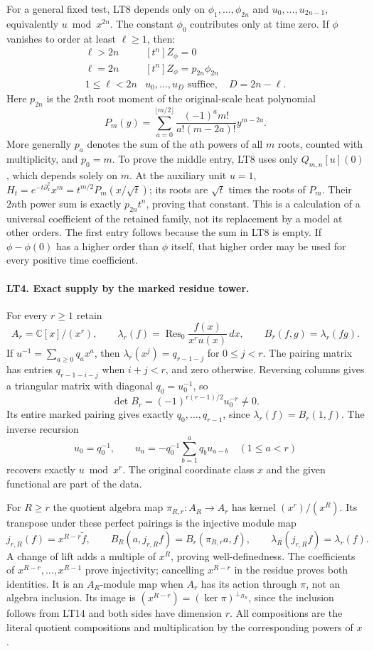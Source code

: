 For a general fixed test, LT8 depends only on $\phi_1,\ldots,\phi_{2n}$
and $u_0,\ldots,u_{2n-1}$, equivalently $u\bmod x^{2n}$.
The constant $\phi_0$ contributes only at time zero.
If $\phi$ vanishes to order at least $\ell\ge1$, then:
\[
 \begin{array}{c|c}
  \ell>2n &[t^n]Z_\phi=0\\
  \ell=2n &[t^n]Z_\phi=p_{2n}\phi_{2n}\\
  1\le\ell<2n &u_0,\ldots,u_D\text{ suffice},\quad D=2n-\ell.
 \end{array}
 \tag{LT9}
\]
Here $p_{2n}$ is the $2n$th root moment of the original-scale
heat polynomial
\[
 P_m(y)=\sum_{a=0}^{\lfloor m/2\rfloor}
       \frac{(-1)^am!}{a!(m-2a)!}y^{m-2a}.
 \tag{LT10}
\]
More generally $p_a$ denotes the sum of the $a$th powers of
all $m$ roots, counted with multiplicity, and $p_0=m$.
To prove the middle entry, LT8 uses only $Q_{m,n}[u](0)$,
which depends solely on $m$. At the auxiliary unit $u=1$,
$H_t=e^{-t\partial_x^2}x^m=t^{m/2}P_m(x/\sqrt t)$;
its roots are $\sqrt t$ times the roots of $P_m$.
Their $2n$th power sum is exactly $p_{2n}t^n$, proving that
constant. This is a calculation of a universal coefficient of the
retained family, not its replacement by a model at other orders.
The first entry follows because the sum in LT8 is empty.
If $\phi-\phi(0)$ has a higher order than $\phi$ itself, that
higher order may be used for every positive time coefficient.

\paragraph{LT4. Exact supply by the marked residue tower.}
For every $r\ge1$ retain
\[
 A_r=\mathbb C[x]/(x^r),\qquad
 \lambda_r(f)=\operatorname{Res}_0\frac{f(x)}{x^ru(x)}\,dx,
 \qquad B_r(f,g)=\lambda_r(fg).
 \tag{LT11}
\]
If $u^{-1}=\sum_{a\ge0}q_ax^a$, then
$\lambda_r(x^j)=q_{r-1-j}$ for $0\le j<r$.
The pairing matrix has entries $q_{r-1-i-j}$ when $i+j<r$,
and zero otherwise. Reversing columns gives a triangular matrix
with diagonal $q_0=u_0^{-1}$, so
\[
 \det B_r=(-1)^{r(r-1)/2}u_0^{-r}\ne0.
 \tag{LT12}
\]
Its entire marked pairing gives exactly $q_0,\ldots,q_{r-1}$,
since $\lambda_r(f)=B_r(1,f)$. The inverse recursion
\[
 u_0=q_0^{-1},\qquad
 u_a=-q_0^{-1}\sum_{b=1}^a q_bu_{a-b}\quad(1\le a<r)
 \tag{LT13}
\]
recovers exactly $u\bmod x^r$.
The original coordinate class $x$ and the given functional are
part of the data.

For $R\ge r$ the quotient algebra map $\pi_{R,r}:A_R\to A_r$
has kernel $(x^r)/(x^R)$. Its transpose under these perfect
pairings is the injective module map
\[
 j_{r,R}(f)=x^{R-r}\widetilde f,\qquad
 B_R(a,j_{r,R}f)=B_r(\pi_{R,r}a,f),\qquad
 \lambda_R(j_{r,R}f)=\lambda_r(f).
 \tag{LT14}
\]
A change of lift adds a multiple of $x^R$, proving
well-definedness. The coefficients of $x^{R-r},\ldots,x^{R-1}$
prove injectivity; cancelling $x^{R-r}$ in the residue proves
both identities. It is an $A_R$-module map when $A_r$ has its
action through $\pi$, not an algebra inclusion. Its image is
$(x^{R-r})=(\ker\pi)^{\perp_{B_R}}$, since the inclusion follows
from LT14 and both sides have dimension $r$. All compositions
are the literal quotient compositions and multiplication by the
corresponding powers of $x$.

